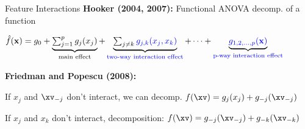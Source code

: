 \documentclass[10pt,compress,t,notes=noshow,xcolor=table]{beamer}
\newcommand{\highlight}[1]{\colorbox{orange}{$\displaystyle #1$}}
\begin{document}
\begin{framev}[align=top]{Feature Interactions}
\textbf{Hooker (2004, 2007):} Functional ANOVA decomp. of a function%
\begin{center}
$\textstyle
\hat{f}(\mathbf{x}) = g_0 +
\underbrace{\textstyle\sum_{j=1}^{p} {{g_j(x_j)}}}_{\text{{main effect}}} +
\underbrace{\textstyle\sum_{j \neq k} {\textcolor{blue}{g_{j,k}(x_j, x_k)}}}_{\text{\textcolor{blue}{two-way interaction effect}}} +
\cdots +
\underbrace{{\textcolor{blue}{g_{1,2,\ldots,p}(\mathbf{x})}}}_{\text{\textcolor{blue}{p-way interaction effect}}}
$
\end{center}
\textbf{Friedman and Popescu (2008):} %
\begin{itemizeM}
\item[$\Rightarrow$]
If $x_j$ and $\xv_{-j}$ don't interact, we can decomp. $f(\xv) = g_{j}(x_{j}) + g_{-j}(\xv_{-j})$\\
\item[$\Rightarrow$]
If $x_j$ and $x_k$ don't interact, decomposition: $f(\xv) = g_{-j}(\xv_{-j}) + g_{-k}(\xv_{-k})$
\end{itemizeM}


\end{framev}
\end{document}
